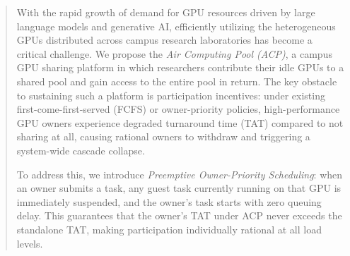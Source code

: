 
\begin{abstract}

With the rapid growth of demand for GPU resources driven by large language
models and generative AI, efficiently utilizing the heterogeneous GPUs
distributed across campus research laboratories has become a critical challenge.
We propose the \emph{Air Computing Pool (ACP)}, a campus GPU sharing platform
in which researchers contribute their idle GPUs to a shared pool and gain
access to the entire pool in return.
The key obstacle to sustaining such a platform is participation incentives:
under existing first-come-first-served (FCFS) or owner-priority policies,
high-performance GPU owners experience degraded turnaround time (TAT)
compared to not sharing at all, causing rational owners to withdraw
and triggering a system-wide cascade collapse.


To address this, we introduce \emph{Preemptive Owner-Priority Scheduling}:
when an owner submits a task, any guest task currently running on that GPU
is immediately suspended, and the owner's task starts with zero queuing delay.
This guarantees that the owner's TAT under ACP never exceeds the standalone TAT,
making participation individually rational at all load levels.



\end{abstract}
